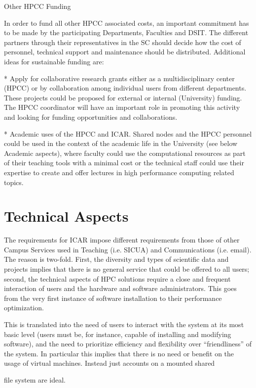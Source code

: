 \documentclass{article}
\begin{document}
Other HPCC Funding

In order to fund all other HPCC associated costs, an important commitment has to be made by the participating Departments, Faculties and DSIT. The different partners through their representatives in the SC should decide how the cost of personnel, technical support and maintenance should be distributed. Additional ideas for sustainable funding are:

* Apply for collaborative research grants either as a multidisciplinary center (HPCC) or by collaboration among individual users from different departments. These projects could be proposed for external or internal (University) funding. The HPCC coordinator will have an important role in promoting this activity and looking for funding opportunities and collaborations.

* Academic uses of the HPCC and ICAR. Shared nodes and the HPCC personnel could be used in the context of the academic life in the University (see below Academic aspects), where faculty could use the computational resources as part of their teaching tools with a minimal cost or the technical staff could use their expertise to create and offer lectures in high performance computing related topics.

\section{Technical Aspects}

The requirements for ICAR impose different requirements from those of other Campus Services used in Teaching (i.e. SICUA) and Communications (i.e. email). The reason is two-fold. First, the diversity and types of scientific data and projects implies that there is no general service that could be offered to all users; second, the technical aspects of HPC solutions require a close and frequent interaction of users and the hardware and software administrators. This goes from the very first instance of software installation to their performance optimization.

This is translated into the need of users to interact with the system at its most basic level (users 
must be, for instance, capable of installing and modifying software), and the need to prioritize efficiency and flexibility over “friendliness” of the system. In particular this implies that there is no need or benefit on the usage of virtual machines. Instead just accounts on a mounted shared

file system are ideal.
\end{document}
